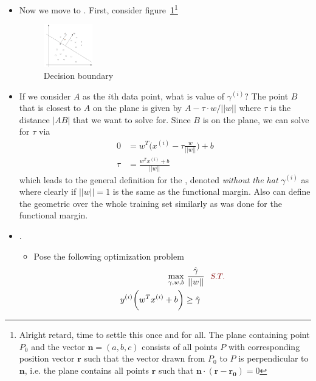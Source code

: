 \documentclass[12pt]{article}
\begin{document}
\begin{itemize}
	\item Now we move to . First, consider figure~\ref{Hyperplane}\footnote{Alright retard, time to settle this once and for all. The plane containing point $P_0$ and the vector $\bm{n} =(a, b, c)$ consists of all points $P$ with corresponding position vector $\bm{r}$ such that the vector drawn from $P_0$ to $P$ is perpendicular to $\bm{n}$, i.e. the plane contains all points $\bm{r}$ such that $\bm{n} \cdot (\bm{r} - \bm{r_0}) = 0$ }
	\begin{figure}[h]
		\centering
		\includegraphics[width=0.2\textwidth]{Hyperplane.PNG}
		\caption{Decision boundary}
		\label{Hyperplane}
	\end{figure}
	
	\item If we consider $A$ as the $i$th data point, what is value of $\gamma^{(i)}$? The point $B$ that is closest to $A$ on the plane is given by $A - \tau \cdot w/||w||$ where $\tau$ is the distance $|AB|$ that we want to solve for. Since $B$ is on the plane, we can solve for $\tau$ via
	\begin{align}
	0 &= w^T \bigg(x^{(i)} - \tau \frac{w}{||w||} \bigg) + b  \\
	\tau &= \frac{w^T x^{(i)}+ b}{||w||}
	\end{align}
	which leads to the general definition for the \textbf{}, denoted \textit{without the hat} $\gamma^{(i)}$ as 
	where clearly if $||w||=1$ is the same as the functional margin. Also can define the geometric over the whole training set similarly as was done for the functional margin. 
	
	\item {}. 
	\begin{itemize}
		\item Pose the following optimization problem
		\begin{align}
		\max_{\gamma, w, b}& ~ \frac{\hat{\gamma}}{||w||} ~~ \mred{S.T.} \\
		y^{(i)} \bigg(w^T x^{(i)}+ b\bigg)& \ge \hat{\gamma} 
		\end{align}
		

\end{itemize}
\end{itemize}
\end{document}
